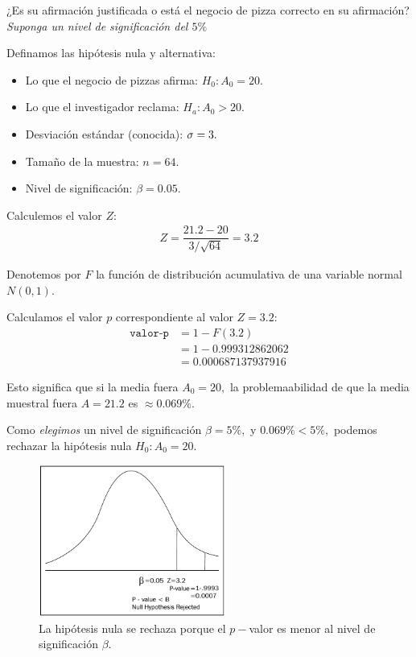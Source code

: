 ¿Es su afirmación justificada o está el negocio de pizza correcto en su afirmación? \emph{Suponga un nivel de significación del $5\%$}


Definamos las hipótesis nula y alternativa:
\begin{itemize}
	\item Lo que el negocio de pizzas afirma: $H_{0}:A_{0}=20.$
	\item Lo que el investigador reclama:
	$H_{a}: A_{0}>20.$
	\item Desviación estándar (conocida): $\sigma=3.$
	\item Tamaño de la muestra: $n=64.$
	\item Nivel de significación: $\beta=0.05.$
\end{itemize}


Calculemos el valor $Z$:
\begin{align}
	Z=\dfrac{21.2-20}{3/\sqrt{64}}=3.2
\end{align}



Denotemos por $F$ la función de distribución acumulativa de una variable normal $N(0,1).$ 

Calculamos el valor $p$ correspondiente al valor $Z=3.2$:
\begin{align}
	\texttt{valor-p}&=1 - F(3.2)\\
	&=1-0.999312862062\\
	&= 0.000687137937916
\end{align}



Esto significa que si la media fuera $A_{0}=20,$ la problemaabilidad de que la media muestral fuera $A=21.2$ es $\approx 0.069\%.$


Como \emph{elegimos} un nivel de significación $\beta=5\%,$ y $0.069\% < 5\%,$ podemos rechazar la hipótesis nula $H_{0}: A_{0}=20.$


\begin{figure}
	\centering
	\includegraphics[height=5cm,keepaspectratio=true]{./images/kum0405.png}
	\caption{La hipótesis nula se rechaza porque el $p-$valor es menor al nivel de significación $\beta$.}
	\label{fig:0405}
\end{figure}

